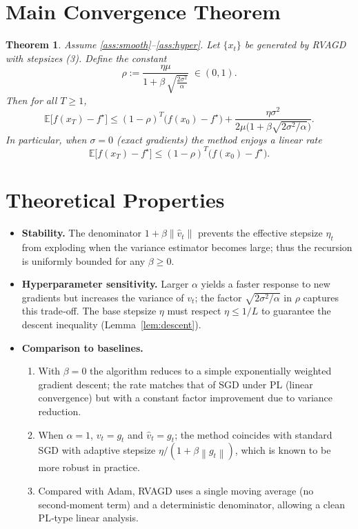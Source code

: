 \documentclass{article}
\newtheorem{theorem}{Theorem}
\newcommand{\E}{\mathbb{E}}
\newcommand{\norm}[1]{\left\lVert #1\right\rVert}
\begin{document}
\section*{Main Convergence Theorem}
\begin{theorem}\label{thm:linear}
Assume \ref{ass:smooth}–\ref{ass:hyper}. Let $\{x_t\}$ be generated by RVAGD with stepsizes (3). Define the constant
\[
\rho:=\frac{\eta\mu}{1+\beta\,\sqrt{\frac{2\sigma^2}{\alpha}}}\; \in(0,1).
\]
Then for all $T\ge 1$,
\[
\E\!\bigl[f(x_T)-f^\star\bigr]\le (1-\rho)^T\bigl(f(x_0)-f^\star\bigr)+\frac{\eta\sigma^2}{2\mu\bigl(1+\beta\sqrt{2\sigma^2/\alpha}\bigr)} .
\tag{5}
\]
In particular, when $\sigma=0$ (exact gradients) the method enjoys a linear rate
\[
\E\!\bigl[f(x_T)-f^\star\bigr]\le (1-\rho)^T\bigl(f(x_0)-f^\star\bigr).
\]
\end{theorem}

\section*{Theoretical Properties}
\begin{itemize}
\item \textbf{Stability.} The denominator $1+\beta\norm{\hat v_t}$ prevents the effective stepsize $\eta_t$ from exploding when the variance estimator becomes large; thus the recursion is uniformly bounded for any $\beta\ge0$.
\item \textbf{Hyperparameter sensitivity.} Larger $\alpha$ yields a faster response to new gradients but increases the variance of $v_t$; the factor $\sqrt{2\sigma^2/\alpha}$ in $\rho$ captures this trade‑off. The base stepsize $\eta$ must respect $\eta\le 1/L$ to guarantee the descent inequality (Lemma~\ref{lem:descent}).
\item \textbf{Comparison to baselines.} 
    \begin{enumerate}
        \item With $\beta=0$ the algorithm reduces to a simple exponentially weighted gradient descent; the rate matches that of SGD under PL (linear convergence) but with a constant factor improvement due to variance reduction.
        \item When $\alpha=1$, $v_t=g_t$ and $\hat v_t=g_t$; the method coincides with standard SGD with adaptive stepsize $\eta/(1+\beta\norm{g_t})$, which is known to be more robust in practice.
        \item Compared with Adam, RVAGD uses a single moving average (no second‑moment term) and a deterministic denominator, allowing a clean PL‑type linear analysis.
    \end{enumerate}
\end{itemize}
\end{document}

